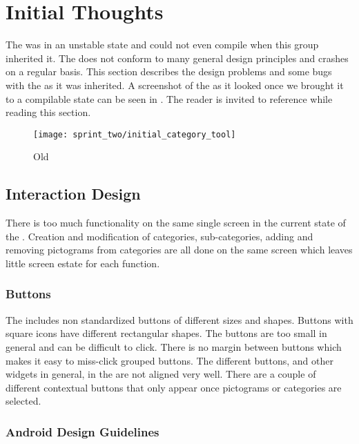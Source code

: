 \section{Initial Thoughts}

The \ct was in an unstable state and could not even compile when this group inherited it. The \ct does not conform to many general design principles and crashes on a regular basis. This section describes the design problems and some bugs with the \ct as it was inherited. A screenshot of the \ct as it looked once we brought it to a compilable state can be seen in . The reader is invited to reference  while reading this section.

\begin{figure}[!htbp]
    \centering
    \texttt{[image: sprint\_two/initial\_category\_tool]}
    \caption{Old \ct}
    \label{fig:category_tool_old}
\end{figure}

\subsection{Interaction Design}

There is too much functionality on the same single screen in the current state of the \ct. Creation and modification of categories, sub-categories, adding and removing pictograms from categories are all done on the same screen which leaves little screen estate for each function.  

\subsubsection{Buttons}

The \ct includes non standardized buttons of different sizes and shapes. Buttons with square icons have different rectangular shapes. The buttons are too small in general and can be difficult to click. There is no margin between buttons which makes it easy to miss-click grouped buttons. The different buttons, and other widgets in general, in the \ct are not aligned very well. There are a couple of different contextual buttons that only appear once pictograms or categories are selected. 

\subsubsection{Android Design Guidelines}

